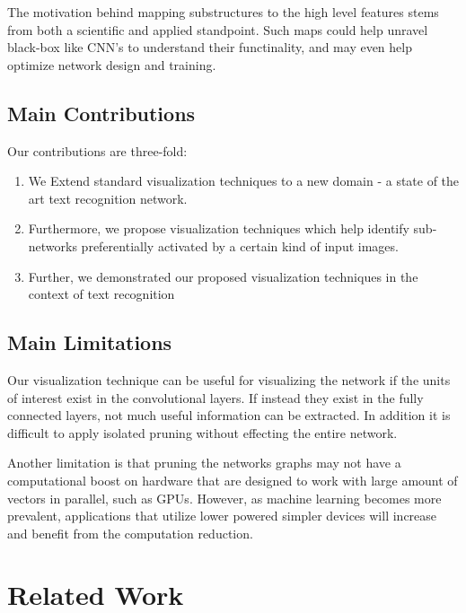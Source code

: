 \documentclass[10pt,twocolumn,letterpaper]{article}
\begin{document}
The motivation behind mapping substructures to the high level features stems from both a scientific and applied standpoint. Such maps could help unravel black-box like CNN's to understand their functinality, and may even help optimize network design and training.


\subsection{Main Contributions}
Our contributions are three-fold:
\begin{enumerate}
\item We Extend standard visualization techniques to a new domain - a state of the art text recognition network.


\item Furthermore, we propose visualization techniques which help identify sub-networks preferentially activated by a certain kind of input images.


\item Further, we demonstrated our proposed visualization techniques in the context of text recognition
\end{enumerate}


\subsection{Main Limitations}
Our visualization technique can be useful for visualizing the network if the units of interest exist in the convolutional layers. If instead they exist in the fully connected layers, not much useful information can be extracted. In addition it is difficult to apply isolated pruning without effecting the entire network.


Another limitation is that pruning the networks graphs may not have a computational boost on hardware that are designed to work with large amount of vectors in parallel, such as GPUs. However, as machine learning becomes more prevalent, applications that utilize lower powered simpler devices will increase and benefit from the computation reduction.


\section{Related Work}
\end{document}
